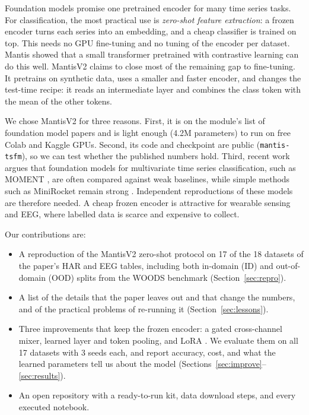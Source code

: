 \documentclass[conference]{IEEEtran}
\begin{document}
Foundation models promise one pretrained encoder for many time series tasks. For classification, the most practical
use is \emph{zero-shot feature extraction}: a frozen encoder turns each series into an embedding, and a cheap
classifier is trained on top. This needs no GPU fine-tuning and no tuning of the encoder per dataset. Mantis
\cite{mantis} showed that a small transformer pretrained with contrastive learning can do this well. MantisV2
\cite{mantisv2} claims to close most of the remaining gap to fine-tuning. It pretrains on synthetic data, uses a
smaller and faster encoder, and changes the test-time recipe: it reads an intermediate layer and combines the class
token with the mean of the other tokens.

We chose MantisV2 for three reasons. First, it is on the module's list of foundation model papers and is light
enough (4.2M parameters) to run on free Colab and Kaggle GPUs. Second, its code and checkpoint are public
(\texttt{mantis-tsfm}), so we can test whether the published numbers hold. Third, recent work argues that foundation
models for multivariate time series classification, such as MOMENT \cite{moment}, are often compared against weak
baselines, while simple methods such as MiniRocket \cite{minirocket} remain strong \cite{fm4mtsc,bakeoff}. Independent
reproductions \cite{pineau} of these models are therefore needed. A cheap frozen encoder is attractive for
wearable sensing and EEG, where labelled data is scarce and expensive to collect.

Our contributions are:
\begin{itemize}
\item A reproduction of the MantisV2 zero-shot protocol on 17 of the 18 datasets of the paper's HAR and EEG tables,
including both in-domain (ID) and out-of-domain (OOD) splits from the WOODS benchmark \cite{woods}
(Section~\ref{sec:repro}).
\item A list of the details that the paper leaves out and that change the numbers, and of the practical problems of
re-running it (Section~\ref{sec:lessons}).
\item Three improvements that keep the frozen encoder: a gated cross-channel mixer, learned layer and token
pooling, and LoRA \cite{lora}. We evaluate them on all 17 datasets with 3 seeds each, and report accuracy, cost, and
what the learned parameters tell us about the model (Sections~\ref{sec:improve}--\ref{sec:results}).
\item An open repository with a ready-to-run kit, data download steps, and every executed notebook.
\end{itemize}
\end{document}
